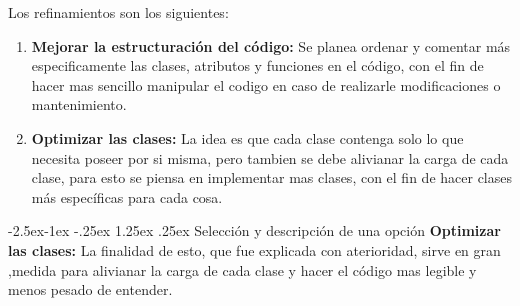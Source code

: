 \documentclass[12pt]{article}
\makeatletter
\renewcommand\paragraph{\@startsection{paragraph}{4}{\z@}%
	{-2.5ex\@plus -1ex \@minus -.25ex}%
	{1.25ex \@plus .25ex}%
	{\normalfont\normalsize\bfseries}}
\makeatother
\begin{document}
Los refinamientos son los siguientes:
\begin{enumerate}[1.]
	\item \textbf{Mejorar la estructuración del código:} Se planea ordenar y comentar más especificamente las clases, atributos y funciones en el código, con el fin de hacer mas sencillo manipular el codigo en caso de realizarle modificaciones o mantenimiento.
	
	\item \textbf{Optimizar las clases:} La idea es que cada clase contenga solo lo que necesita poseer por si misma, pero tambien se debe alivianar la carga de cada clase, para esto se piensa en implementar mas clases, con el fin de hacer clases más específicas para cada cosa.
	
\end{enumerate}
\paragraph{Selección y descripción de una opción}
\textbf{Optimizar las clases:} La finalidad de esto, que fue explicada con aterioridad, sirve en gran ,medida para alivianar la carga de cada clase y hacer el código mas legible y menos pesado de entender.




\newpage

\end{document}
